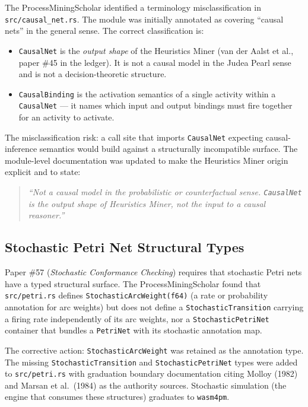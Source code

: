 The ProcessMiningScholar identified a terminology misclassification in
\texttt{src/causal\_net.rs}. The module was initially annotated as covering
``causal nets'' in the general sense. The correct classification is:

\begin{itemize}
  \item \texttt{CausalNet} is the \emph{output shape} of the Heuristics Miner
    (van der Aalst et al., paper \#45 in the ledger). It is not a causal model
    in the Judea Pearl sense and is not a decision-theoretic structure.
  \item \texttt{CausalBinding} is the activation semantics of a single
    activity within a \texttt{CausalNet} --- it names which input and output
    bindings must fire together for an activity to activate.
\end{itemize}

The misclassification risk: a call site that imports \texttt{CausalNet}
expecting causal-inference semantics would build against a structurally
incompatible surface. The module-level documentation was updated to make the
Heuristics Miner origin explicit and to state:
\begin{quote}
\textit{``Not a causal model in the probabilistic or counterfactual sense.
\texttt{CausalNet} is the output shape of Heuristics Miner, not the input to
a causal reasoner.''}
\end{quote}

\subsection{Stochastic Petri Net Structural Types}

Paper \#57 (\textit{Stochastic Conformance Checking}) requires that stochastic
Petri nets have a typed structural surface. The ProcessMiningScholar found
that \texttt{src/petri.rs} defines \texttt{StochasticArcWeight(f64)} (a
rate or probability annotation for arc weights) but does not define a
\texttt{StochasticTransition} carrying a firing rate independently of its
arc weights, nor a \texttt{StochasticPetriNet} container that bundles a
\texttt{PetriNet} with its stochastic annotation map.

The corrective action: \texttt{StochasticArcWeight} was retained as the
annotation type. The missing \texttt{StochasticTransition} and
\texttt{StochasticPetriNet} types were added to \texttt{src/petri.rs} with
graduation boundary documentation citing Molloy (1982) and Marsan et al.\
(1984) as the authority sources. Stochastic simulation (the engine that consumes
these structures) graduates to \texttt{wasm4pm}.

